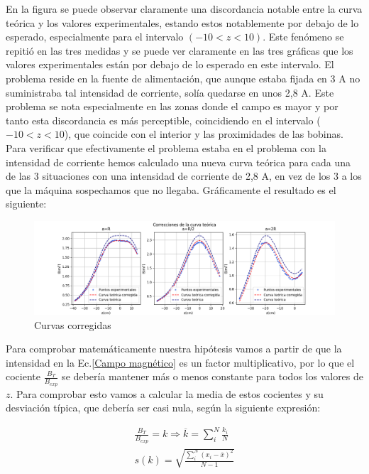 \documentclass[a4paper,12pt,titlepage]{article}
\begin{document}
En la figura se puede observar claramente una discordancia notable entre la curva teórica y los valores experimentales, estando estos notablemente por debajo de lo esperado, especialmente para el intervalo $(-10<z<10)$. Este fenómeno se repitió en las tres medidas y se puede ver claramente en las tres gráficas que los valores experimentales están por debajo de lo esperado en este intervalo. El problema reside en la fuente de alimentación, que aunque estaba fijada en 3 A no suministraba tal intensidad de corriente, solía quedarse en unos 2,8 A. Este problema se nota especialmente en las zonas donde el campo es mayor y por tanto esta discordancia es más perceptible, coincidiendo en el intervalo ($-10<z<10$), que coincide con el interior y las proximidades de las bobinas. Para verificar que efectivamente el problema estaba en el problema con la intensidad de corriente hemos calculado una nueva curva teórica para cada una de las 3 situaciones con una intensidad de corriente de 2,8 A, en vez de los 3 a los que la máquina sospechamos que no llegaba. Gráficamente el resultado es el siguiente:

\begin{figure}[h!]
    \centering
    \includegraphics[width=1.25\linewidth]{Images/CurvasCorregidas.png}
    \caption{Curvas corregidas}
    \label{Curvas corregidas}
\end{figure}

Para comprobar matemáticamente nuestra hipótesis vamos a partir de que la intensidad en la Ec.\ref{Campo magnético} es un factor multiplicativo, por lo que el cociente $\frac{B_{T}}{B_{exp}}$ se debería mantener más o menos constante para todos los valores de $z$. Para comprobar esto vamos a calcular la media de estos cocientes y su desviación típica, que debería ser casi nula, según la siguiente expresión:

\begin{equation}
    \begin{gathered}
    \frac{B_{T}}{B_{exp}} = k \Rightarrow \overline{k} = \sum_i^{N} \frac{k_i}{N} \\
    s(k) = \sqrt{\frac{\sum_i^N (x_i-\overline{x})^2}{N-1}}
    \end{gathered}
\end{equation}
\end{document}

